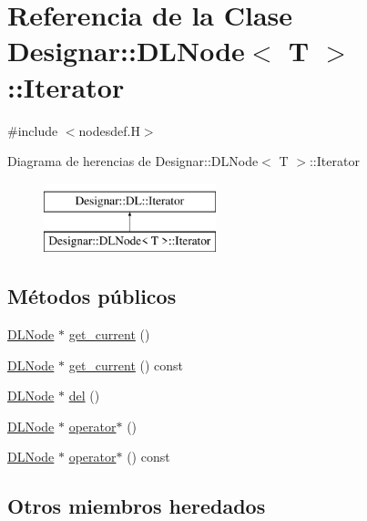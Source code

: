 \hypertarget{class_designar_1_1_d_l_node_1_1_iterator}{}\section{Referencia de la Clase Designar\+:\+:D\+L\+Node$<$ T $>$\+:\+:Iterator}
\label{class_designar_1_1_d_l_node_1_1_iterator}


{\ttfamily \#include $<$nodesdef.\+H$>$}

Diagrama de herencias de Designar\+:\+:D\+L\+Node$<$ T $>$\+:\+:Iterator\begin{figure}[H]
\begin{center}
\leavevmode
\includegraphics[height=2.000000cm]{class_designar_1_1_d_l_node_1_1_iterator}
\end{center}
\end{figure}
\subsection*{Métodos públicos}
\begin{DoxyCompactItemize}
\item 
\hyperlink{class_designar_1_1_d_l_node}{D\+L\+Node} $\ast$ \hyperlink{class_designar_1_1_d_l_node_1_1_iterator_a5787051e4f6727efef70ac3f8991ab59}{get\+\_\+current} ()
\item 
\hyperlink{class_designar_1_1_d_l_node}{D\+L\+Node} $\ast$ \hyperlink{class_designar_1_1_d_l_node_1_1_iterator_a1ea2b71da1fbc4970b9a1c170ddacb13}{get\+\_\+current} () const
\item 
\hyperlink{class_designar_1_1_d_l_node}{D\+L\+Node} $\ast$ \hyperlink{class_designar_1_1_d_l_node_1_1_iterator_a7ba9818dbd9d8cbbd85fe47db3395375}{del} ()
\item 
\hyperlink{class_designar_1_1_d_l_node}{D\+L\+Node} $\ast$ \hyperlink{class_designar_1_1_d_l_node_1_1_iterator_a37adeeda3073b950590700c3e22dcf28}{operator$\ast$} ()
\item 
\hyperlink{class_designar_1_1_d_l_node}{D\+L\+Node} $\ast$ \hyperlink{class_designar_1_1_d_l_node_1_1_iterator_ae75896ae631f91daaaa9a193df27a239}{operator$\ast$} () const
\end{DoxyCompactItemize}
\subsection*{Otros miembros heredados}


